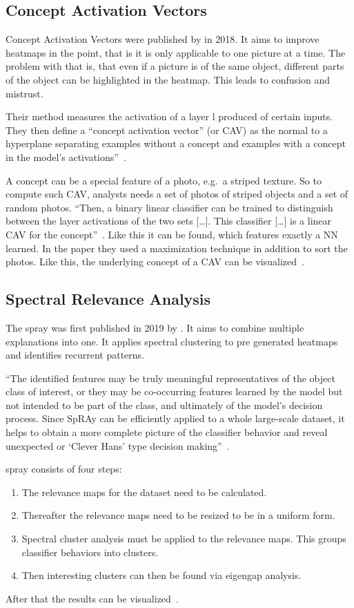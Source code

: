 \subsection{Concept Activation Vectors}
Concept Activation Vectors were published by  in 2018. It aims to improve heatmaps in the point, that is it is only applicable to one picture at a time. The problem with that is, that even if a picture is of the same object, different parts of the object can be highlighted in the heatmap. This leads to confusion and mistrust.
\par
Their method measures the activation of a layer l produced of certain inputs. They then define a “concept activation vector” (or CAV) as the normal to a hyperplane separating examples without a concept and examples with a concept in the model’s activations”~\cite[3]{Kim.2018}.
\par
A concept can be a special feature of a photo, e.g.\ a striped texture. So to compute such CAV, analysts needs a set of photos of striped objects and a set of random photos.
“Then, a binary linear classifier can be trained to distinguish between the layer activations of the two sets 
[\ldots].
This classifier 
[\ldots]
is a linear CAV for the concept”~\cite[3]{Kim.2018}. Like this it can be found, which features exactly a NN learned.
In the paper they used a maximization technique in addition to sort the photos. Like this, the  underlying concept of a CAV can be visualized~\cite{Kim.2018}.

\subsection{Spectral Relevance Analysis}
The \gls{spray} was first published in 2019 by . It aims to combine multiple explanations into one. It applies spectral clustering to pre generated heatmaps and identifies recurrent patterns. 
\par
“The identified features may be truly meaningful representatives of the object class of interest, or they may be co-occurring features learned by the model but not intended to be part of the class, and ultimately of the model’s decision process. Since SpRAy can be efficiently applied to a whole large-scale dataset, it helps to obtain a more complete picture of the classifier behavior and reveal unexpected or ‘Clever Hans’ type decision making”~\cite[8]{Lapuschkin.2019}.
\par
\gls{spray} consists of four steps:
\begin{enumerate}
    \item The relevance maps for the dataset need to be calculated.
    \item Thereafter the relevance maps need to be resized to be in a uniform form.
    \item Spectral cluster analysis must be applied to the relevance maps. This groups classifier behaviors into clusters.
    \item Then interesting clusters can then be found via eigengap analysis.
\end{enumerate}
After that the results can be visualized~\cite{Lapuschkin.2019}.
